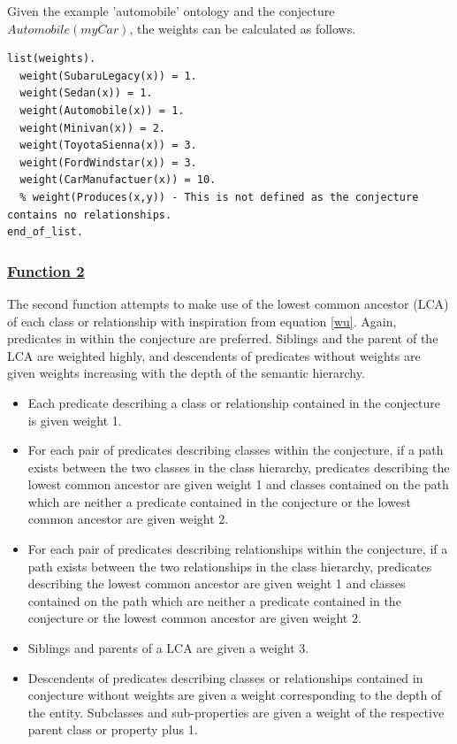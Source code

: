 \documentclass{article}
\begin{document}
Given the example 'automobile' ontology and the conjecture $Automobile(myCar)$, the weights can be calculated as follows. 

\begin{singlespace}
\begin{verbatim}
list(weights).
  weight(SubaruLegacy(x)) = 1. 
  weight(Sedan(x)) = 1. 
  weight(Automobile(x)) = 1. 
  weight(Minivan(x)) = 2. 
  weight(ToyotaSienna(x)) = 3. 
  weight(FordWindstar(x)) = 3. 
  weight(CarManufactuer(x)) = 10. 
  % weight(Produces(x,y)) - This is not defined as the conjecture contains no relationships. 
end_of_list.
\end{verbatim}
\end{singlespace}

\subsubsection{\underline{Function 2}}

The second function attempts to make use of the lowest common ancestor (LCA) of each class or relationship with inspiration from equation \ref{wu}. Again, predicates in within the conjecture are preferred. Siblings and the parent of the LCA are weighted highly, and descendents of predicates without weights are given weights increasing with the depth of the semantic hierarchy. 

\begin{singlespace}
\begin{itemize}
	\item Each predicate describing a class or relationship contained in the conjecture is given weight 1. 
	\item For each pair of predicates describing classes within the conjecture, if a path exists between the two classes in the class hierarchy, predicates describing the lowest common ancestor are given weight 1 and classes contained on the path which are neither a predicate contained in the conjecture or the lowest common ancestor are given weight 2. 
	\item For each pair of predicates describing relationships within the conjecture, if a path exists between the two relationships in the class hierarchy, predicates describing the lowest common ancestor are given weight 1 and classes contained on the path which are neither a predicate contained in the conjecture or the lowest common ancestor are given weight 2. 
	\item Siblings and parents of a LCA are given a weight 3. 
	\item Descendents of predicates describing classes or relationships contained in conjecture without weights are given a weight corresponding to the depth of the entity. Subclasses and sub-properties are given a weight of the respective parent class or property plus 1. 
\end{itemize}
\end{singlespace}
\end{document}
